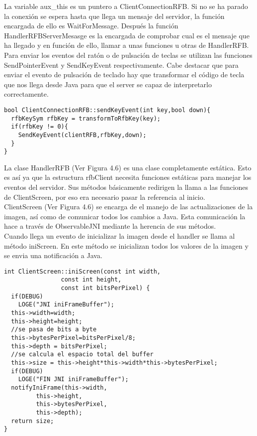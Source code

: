 La variable aux\_this es un puntero a ClientConnectionRFB. Si no se ha parado la conexión se espera hasta que llega un mensaje del servidor, la función encargada de ello es WaitForMessage. Después la función HandlerRFBServerMesasge es la encargada de comprobar cual es el mensaje que ha llegado y en función de ello, llamar a unas funciones u otras de HandlerRFB.\\

Para enviar los eventos del ratón o de pulsación de teclas se utilizan las funciones SendPointerEvent y SendKeyEvent respectivamente. Cabe destacar que para enviar el evento de pulsación de teclado hay que transformar el código de tecla que nos llega desde Java para que el server se capaz de interpretarlo correctamente.
\begin{lstlisting}
bool ClientConnectionRFB::sendKeyEvent(int key,bool down){
  rfbKeySym rfbKey = transformToRfbKey(key);
  if(rfbKey != 0){
    SendKeyEvent(clientRFB,rfbKey,down);
  }
}
\end{lstlisting}

La clase HandlerRFB (Ver Figura 4.6) es una clase completamente estática. Esto es así ya que la estructura rfbClient necesita funciones estáticas para manejar los eventos del servidor. Sus métodos básicamente redirigen la llama a las funciones de ClientScreen, por eso era necesario pasar la referencia al inicio.\\

ClientScreen (Ver Figura 4.6) se encarga de el manejo de las actualizaciones de la imagen, así como de comunicar todos los cambios a Java. Esta comunicación la hace a través de ObservableJNI mediante la herencia de sus métodos.\\

Cuando llega un evento de inicializar la imagen desde el handler se llama al método iniScreen. En este método se inicializan todos los valores de la imagen y se envia una notificación a Java.
\begin{lstlisting}
int ClientScreen::iniScreen(const int width,
			    const int height,
			    const int bitsPerPixel) {
  if(DEBUG)
    LOGE("JNI iniFrameBuffer");
  this->width=width;
  this->height=height;
  //se pasa de bits a byte
  this->bytesPerPixel=bitsPerPixel/8;
  this->depth = bitsPerPixel;
  //se calcula el espacio total del buffer
  this->size = this->height*this->width*this->bytesPerPixel;
  if(DEBUG)
    LOGE("FIN JNI iniFrameBuffer");
  notifyIniFrame(this->width,
		 this->height,
		 this->bytesPerPixel,
		 this->depth);
  return size;
}
\end{lstlisting}

